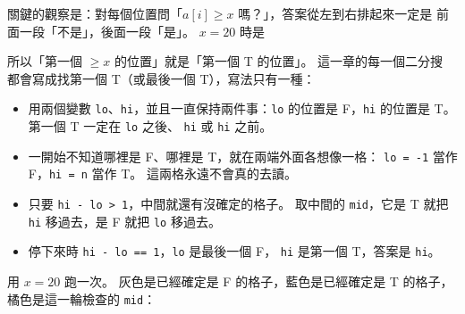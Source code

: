 關鍵的觀察是：對每個位置問「$a[i] \ge x$ 嗎？」，答案從左到右排起來一定是
前面一段「不是」，後面一段「是」。 $x = 20$ 時是

\begin{center}
\label{fig:bs-ft}
\end{center}

所以「第一個 $\ge x$ 的位置」就是「第一個 T 的位置」。 這一章的每一個二分搜
都會寫成找第一個 T（或最後一個 T），寫法只有一種：

\begin{itemize}
\item 用兩個變數 \texttt{lo}、\texttt{hi}，並且一直保持兩件事：\texttt{lo}
的位置是 F，\texttt{hi} 的位置是 T。 第一個 T 一定在 \texttt{lo} 之後、
\texttt{hi} 或 \texttt{hi} 之前。
\item 一開始不知道哪裡是 F、哪裡是 T，就在兩端外面各想像一格：
\texttt{lo = -1} 當作 F，\texttt{hi = n} 當作 T。 這兩格永遠不會真的去讀。
\item 只要 \texttt{hi - lo > 1}，中間就還有沒確定的格子。 取中間的
\texttt{mid}，它是 T 就把 \texttt{hi} 移過去，是 F 就把 \texttt{lo} 移過去。
\item 停下來時 \texttt{hi - lo == 1}，\texttt{lo} 是最後一個 F，
\texttt{hi} 是第一個 T，答案是 \texttt{hi}。
\end{itemize}

用 $x = 20$ 跑一次。 灰色是已經確定是 F 的格子，藍色是已經確定是 T 的格子，
橘色是這一輪檢查的 \texttt{mid}：

\begin{center}
\label{fig:bs-trace}
\end{center}

